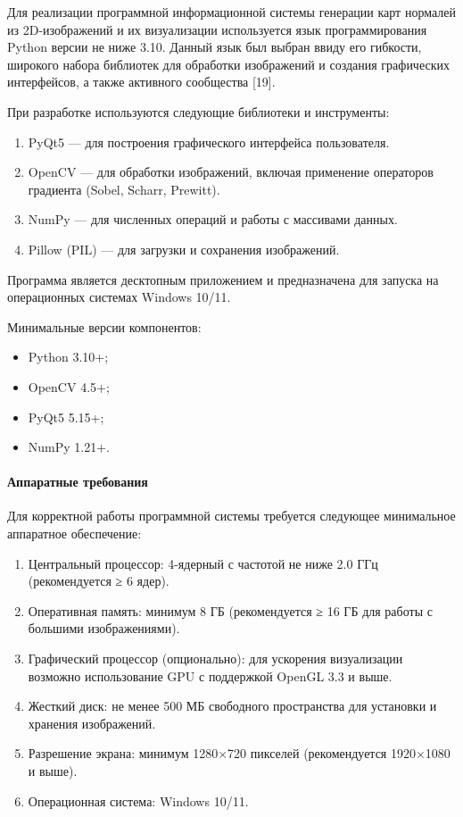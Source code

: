 Для реализации программной информационной системы генерации карт нормалей из 2D-изображений и их визуализации используется язык программирования Python версии не ниже 3.10. Данный язык был выбран ввиду его гибкости, широкого набора библиотек для обработки изображений и создания графических интерфейсов, а также активного сообщества [19].

При разработке используются следующие библиотеки и инструменты:
\begin{enumerate}
	\item PyQt5 — для построения графического интерфейса пользователя.
	\item OpenCV — для обработки изображений, включая применение операторов градиента (Sobel, Scharr, Prewitt).
	\item NumPy — для численных операций и работы с массивами данных.
	\item Pillow (PIL) — для загрузки и сохранения изображений.
\end{enumerate}

Программа является десктопным приложением и предназначена для запуска на операционных системах Windows 10/11.

Минимальные версии компонентов:
\begin{itemize}
	\item Python 3.10+;
	\item OpenCV 4.5+;
	\item PyQt5 5.15+;
	\item NumPy 1.21+.
\end{itemize}
\paragraph{Аппаратные требования}

Для корректной работы программной системы требуется следующее минимальное аппаратное обеспечение:
\begin{enumerate}
	\item Центральный процессор: 4-ядерный с частотой не ниже 2.0 ГГц (рекомендуется ≥ 6 ядер).
	\item Оперативная память: минимум 8 ГБ (рекомендуется ≥ 16 ГБ для работы с большими изображениями).
	\item Графический процессор (опционально): для ускорения визуализации возможно использование GPU с поддержкой OpenGL 3.3 и выше.
	\item Жесткий диск: не менее 500 МБ свободного пространства для установки и хранения изображений.
	\item Разрешение экрана: минимум 1280×720 пикселей (рекомендуется 1920×1080 и выше).
	\item Операционная система: Windows 10/11.
\end{enumerate}


